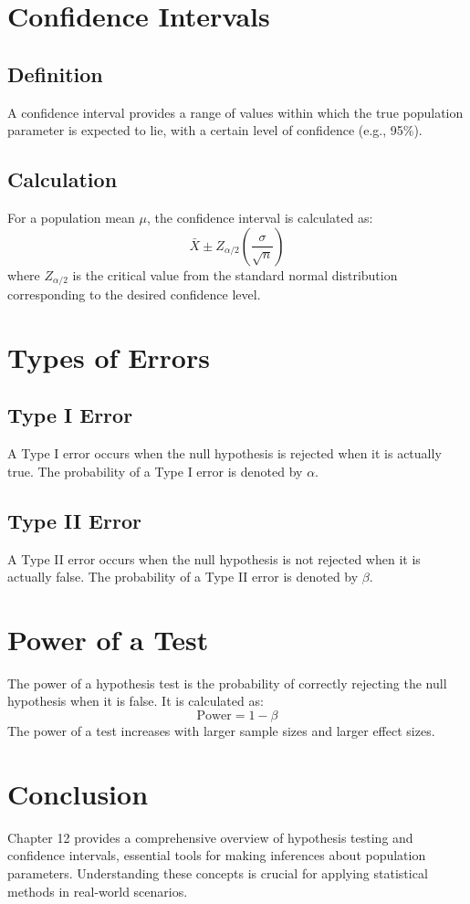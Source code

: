 \documentclass{article}
\begin{document}
\section{Confidence Intervals}
\subsection{Definition}
A confidence interval provides a range of values within which the true population parameter is expected to lie, with a certain level of confidence (e.g., 95\%).

\subsection{Calculation}
For a population mean $\mu$, the confidence interval is calculated as:
\[
\bar{X} \pm Z_{\alpha/2} \left( \frac{\sigma}{\sqrt{n}} \right)
\]
where $Z_{\alpha/2}$ is the critical value from the standard normal distribution corresponding to the desired confidence level.

\section{Types of Errors}
\subsection{Type I Error}
A Type I error occurs when the null hypothesis is rejected when it is actually true. The probability of a Type I error is denoted by $\alpha$.

\subsection{Type II Error}
A Type II error occurs when the null hypothesis is not rejected when it is actually false. The probability of a Type II error is denoted by $\beta$.

\section{Power of a Test}
The power of a hypothesis test is the probability of correctly rejecting the null hypothesis when it is false. It is calculated as:
\[
\text{Power} = 1 - \beta
\]
The power of a test increases with larger sample sizes and larger effect sizes.

\section{Conclusion}
Chapter 12 provides a comprehensive overview of hypothesis testing and confidence intervals, essential tools for making inferences about population parameters. Understanding these concepts is crucial for applying statistical methods in real-world scenarios.
\end{document}
